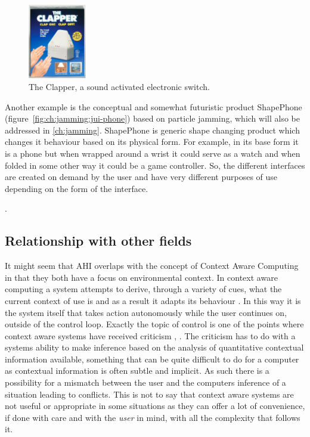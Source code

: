 \begin{figure}[hb]
	\centering
  		\includegraphics[width=1in]{figures/theclapper}
	\caption[The Clapper, a sound activated electronic switch.]
   {The Clapper, a sound activated electronic switch.}
   \label{ch:adhoc:theclapper}
\end{figure}

Another example is the conceptual and somewhat futuristic product ShapePhone (figure~\ref{fig:ch:jamming:jui-phone}) based on particle jamming, which will also be addressed in \autoref{ch:jamming}.
ShapePhone is generic shape changing product which changes it behaviour based on its physical form.
For example, in its base form it is a phone but when wrapped around a wrist it could serve as a watch and when folded in some other way it could be a game controller.
So, the different interfaces are created on demand by the user and have very different purposes of use depending on the form of the interface.

.
\blank
{} 

\subsection{Relationship with other fields} 
It might seem that AHI overlaps with the concept of Context Aware Computing in that they both have a focus on environmental context.
In context aware computing a system attempts to derive, through a variety of cues, what the current context of use is and as a result it adapts its behaviour \citep[chap. 8]{krumm2009ubiquitous}. 
In this way it is the system itself that takes action autonomously while the user continues on, outside of the control loop.
Exactly the topic of control is one of the points where context aware systems have received criticism \cite{erickson2002some}, \citep[chap. 8]{krumm2009ubiquitous}.
The criticism has to do with a systems ability to make inference based on the analysis of quantitative contextual information available, something that can be quite difficult to do for a computer as contextual information is often subtle and implicit.
As such there is a possibility for a mismatch between the user and the computers inference of a situation leading to conflicts.
This is not to say that context aware systems are not useful or appropriate in some situations as they can offer a lot of convenience, if done with care and with the \emph{user} in mind, with all the complexity that follows it.

